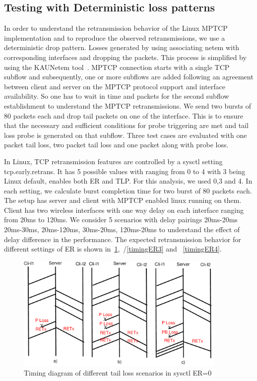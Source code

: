 \documentclass[12pt,draftcls,onecolumn]{IEEEtran}
\begin{document}
\subsection{Testing with Deterministic loss patterns}
In order to understand the retransmission behavior of the Linux MPTCP implementation and to reproduce the observed retransmissions, we use a deterministic drop pattern.
Losses generated by using associating netem with corresponding interfaces and dropping the packets. This process is simplified by using the KAUNetem tool~\cite{Garcia2016}. 
MPTCP connection starts with a single TCP subflow and subsequently, one or more subflows are added following an agreement between client and server on the MPTCP protocol 
support and interface availability. So one has to wait in time and packets for the second subflow establishment to understand the MPTCP retransmissions. We send two bursts of 80 
packets each and drop tail packets on one of the interface. This is to ensure that the necessary and sufficient conditions for probe triggering are met and tail loss probe is generated on that
subflow. Three test cases are evaluated with one packet tail loss, two packet tail loss and  one packet along with probe loss. 

In Linux, TCP retransmission features are controlled by a sysctl setting tcp.early.retrans. It has 5 possible values with ranging from 0 to 4 with 3 being Linux default, enables both
ER and TLP. For this analysis, we used 0,3 and 4. In each setting, we calculate burst completion time for two burst of 80 packets each. The setup has server and client with MPTCP
enabled linux running on them. Client has two wireless interfaces with one way delay on each interface ranging from 20ms to 120ms. We consider 5 scenarios with delay pairings 20ms-20ms
20ms-30ms, 20ms-120ms, 30ms-20ms, 120ms-20ms to understand the effect of delay difference in the performance. The expected retransmission behavior for different settings of ER is shown 
in~\ref{timingER0},~/\ref{timingER3} and ~\ref{timingER4}.

\begin{figure}[!ht]
\begin{center}
\includegraphics[angle=0, width=0.9\textwidth, natwidth=610, natheight=400]{images/timingER0.pdf}
\end{center}
\caption{Timing diagram of different tail loss scenarios in sysctl ER=0}\label{timingER0}
\end{figure}
\end{document}
